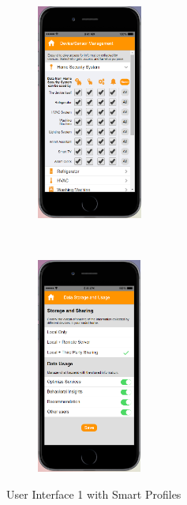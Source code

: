 \begin{figure}[htb]
\begin{subfigure}[t]{0.2\textwidth}
	\end{subfigure}%
	~~~~~
	\begin{subfigure}[t]{0.2\textwidth}
		\centering
		\includegraphics[height=2.8in]{figures/ui1sp4.png}
	\end{subfigure}%
	~~~~~
	\begin{subfigure}[t]{0.2\textwidth}
		\centering
		\includegraphics[height=2.8in]{figures/ui1sp5.png}
	\end{subfigure}%
	\caption{User Interface 1 with Smart Profiles}
	\label{fig:ui1Profiles}
\end{figure}


